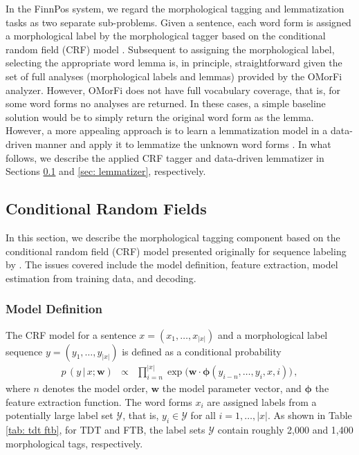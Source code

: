 \documentclass[smallextended]{svjour3}       %
\begin{document}
In the FinnPos system, we regard the morphological tagging and lemmatization tasks as two separate sub-problems. Given a sentence, each word form is assigned a morphological label by the morphological tagger based on the conditional random field (CRF) model \citep{lafferty2001}. Subsequent to assigning the morphological label, selecting the appropriate word lemma is, in principle, straightforward given the set of full analyses (morphological labels and lemmas) provided by the OMorFi analyzer. However, OMorFi does not have full vocabulary coverage, that is, for some word forms no analyses are returned. In these cases, a simple baseline solution would be to simply return the original word form as the lemma. However, a more appealing approach is to learn a lemmatization model in a data-driven manner and apply it to lemmatize the unknown word forms \citep{chrupala2008}. In what follows, we describe the applied CRF tagger and data-driven lemmatizer in Sections \ref{sec: crfs} and \ref{sec: lemmatizer}, respectively.


\subsection{Conditional Random Fields}
\label{sec: crfs}

In this section, we describe the morphological tagging component based on the conditional random field (CRF) model presented originally for sequence labeling by \citet{lafferty2001}. The issues covered include the model definition, feature extraction, model estimation from training data, and decoding.

\subsubsection{Model Definition}

The CRF model \citep{lafferty2001} for a sentence $x = (x_1, \dots, x_{|x|})$ and a morphological label sequence $y = (y_1, \dots, y_{|x|})$ is defined as a conditional probability
%
\begin{eqnarray}
p\,({y} \, | \, x; \boldsymbol{w}) & \propto & \prod_{i=n}^{|x|} \exp\Big( \boldsymbol{w} \cdot \boldsymbol{\phi}(y_{i-n}, \dots, y_i, x, i) \Big) \, ,						
\label{eq: crf}
\end{eqnarray}
%
where $n$ denotes the model order, $\boldsymbol{w}$ the model parameter vector, and $\boldsymbol{\phi}$ the feature extraction function. The word forms $x_i$ are assigned labels from a potentially large label set $\mathcal{Y}$, that is, $y_i \in \mathcal{Y}$ for all $i = 1, \dots, |x|$. As shown in Table \ref{tab: tdt ftb}, for TDT and FTB, the label sets $\mathcal{Y}$ contain roughly 2,000 and 1,400 morphological tags, respectively.
\end{document}

